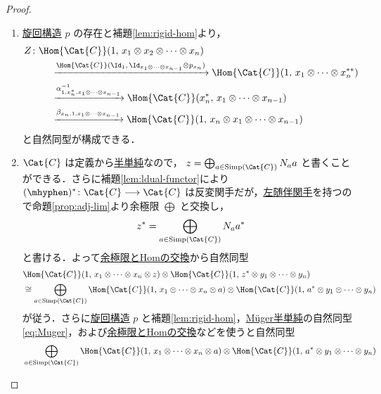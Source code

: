 \documentclass[TQFT_main]{subfiles}
\begin{document}
\begin{proof}
    \begin{enumerate}
        \item \hyperref[def:pivotal]{旋回構造} $p$ の存在と補題\ref{lem:rigid-hom}より，
        \begin{align}
            Z &\colon \Hom{\Cat{C}} (1,\, x_1 \otimes x_2 \otimes \cdots \otimes x_n) \\
            &\qquad \xrightarrow{\Hom{\Cat{C}} (\Id_1,\, \Id_{x_1 \otimes \cdots \otimes x_{n-1}} \otimes p_{x_n})} \Hom{\Cat{C}} (1,\, x_1 \otimes \cdots \otimes x_n^{**})  \\
            &\qquad \xrightarrow{\alpha_{1,x_n^*,x_1\otimes \cdots \otimes x_{n-1}}^{-1}} \Hom{\Cat{C}} (x_n^{*},\, x_1 \otimes \cdots \otimes x_{n-1}) \\
            &\qquad \xrightarrow{\beta_{x_n,1,x_1 \otimes \cdots \otimes x_{n-1}}} \Hom{\Cat{C}} (1,\, x_n \otimes x_1 \otimes \cdots \otimes x_{n-1})
        \end{align}
        と自然同型が構成できる．
        \item $\Cat{C}$ は定義から\hyperref[def:semisimple-cat]{半単純}なので，
        $z = \bigoplus_{a \in \mathrm{Simp}(\Cat{C})} N_a a$ と書くことができる．さらに補題\ref{lem:ldual-functor}により $(\mhyphen)^* \colon \Cat{C} \lto \Cat{C}$ は反変関手だが，\hyperref[def:adjoint]{左随伴関手}を持つので命題\ref{prop:adj-lim}より余極限 $\bigoplus$ と交換し，
        \begin{align}
            z^* = \bigoplus_{a \in \mathrm{Simp}(\Cat{C})} N_a a^*
        \end{align}
        と書ける．よって\hyperref[prop:lim-colim-basic]{余極限とHomの交換}から自然同型
        \begin{align}
            &\Hom{\Cat{C}} (1,\, x_1 \otimes \cdots \otimes x_n \otimes z) \otimes  \Hom{\Cat{C}}(1,\, z^* \otimes y_1 \otimes \cdots \otimes y_n) \\
            &\cong \bigoplus_{a \in \mathrm{Simp}(\Cat{C})} \Hom{\Cat{C}} (1,\, x_1 \otimes \cdots \otimes x_n \otimes a) \otimes  \Hom{\Cat{C}}(1,\, a^* \otimes y_1 \otimes \cdots \otimes y_n)
        \end{align}
        が従う．さらに\hyperref[def:pivotal]{旋回構造} $p$ と補題\ref{lem:rigid-hom}，\hyperref[def:semisimple-Muger]{M\"{u}ger半単純}の自然同型\eqref{eq:Muger}，および\hyperref[prop:lim-colim-basic]{余極限とHomの交換}などを使うと自然同型
        \begin{align}
            &\bigoplus_{a \in \mathrm{Simp}(\Cat{C})} \Hom{\Cat{C}} (1,\, x_1 \otimes \cdots \otimes x_n \otimes a) \otimes  \Hom{\Cat{C}}(1,\, a^* \otimes y_1 \otimes \cdots \otimes y_n) \\

\end{align}
\end{enumerate}
\end{proof}
\end{document}
